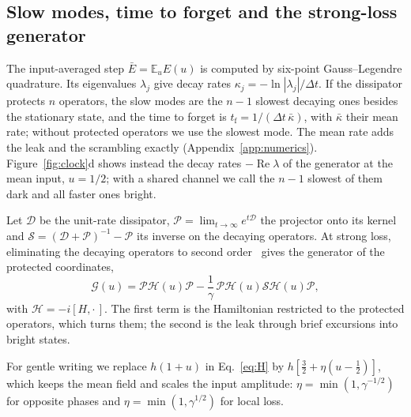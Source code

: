 \subsection{Slow modes, time to forget and the strong-loss generator}
\label{sec:methods-slow}
The input-averaged step $\bar E=\mathbb E_uE(u)$ is computed by six-point Gauss--Legendre quadrature. Its eigenvalues
$\lambda_j$ give decay rates $\kappa_j=-\ln|\lambda_j|/\Delta t$. If the dissipator protects $n$ operators, the slow
modes are the $n-1$ slowest decaying ones besides the stationary state, and the time to forget is
$t_{\mathrm f}=1/(\Delta t\,\bar\kappa)$, with $\bar\kappa$ their mean rate; without protected operators we use the
slowest mode. The mean rate adds the leak and the scrambling exactly (Appendix~\ref{app:numerics}). Figure~\ref{fig:clock}d shows instead the decay rates
$-\operatorname{Re}\lambda$ of the generator at the mean input, $u=1/2$; with a shared channel we call the $n-1$
slowest of them dark and all faster ones bright.

Let $\mathcal D$ be the unit-rate dissipator, $\mathcal P=\lim_{t\to\infty}e^{t\mathcal D}$ the projector onto its
kernel and $\mathcal S=(\mathcal D+\mathcal P)^{-1}-\mathcal P$ its inverse on the decaying operators. At strong loss,
eliminating the decaying operators to second order~\cite{Zanardi2014,Reiter2012} gives the generator of the protected
coordinates,
\begin{equation}
  \mathcal G(u)=\mathcal P\mathcal H(u)\mathcal P-\frac1\gamma\,\mathcal P\mathcal H(u)\mathcal S\mathcal H(u)\mathcal P ,
  \label{eq:reduced}
\end{equation}
with $\mathcal H=-i[H,\cdot\,]$. The first term is the Hamiltonian restricted to the protected operators, which turns
them; the second is the leak through brief excursions into bright states.

For gentle writing we replace $h(1+u)$ in Eq.~\eqref{eq:H} by $h[\tfrac32+\eta(u-\tfrac12)]$, which keeps the mean
field and scales the input amplitude: $\eta=\min(1,\gamma^{-1/2})$ for opposite phases and $\eta=\min(1,\gamma^{1/2})$
for local loss.

